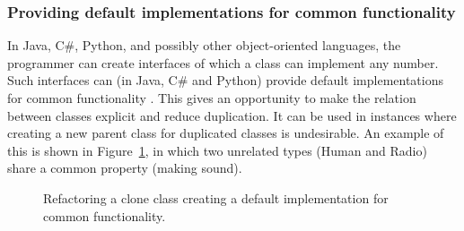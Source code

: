 \subsubsection{Providing default implementations for common functionality}
In Java, C\#, Python, and possibly other object-oriented languages, the programmer can create interfaces of which a class can implement any number. Such interfaces can (in Java, C\# and Python) provide default implementations for common functionality \cite{mohnen2002interfaces}. This gives an opportunity to make the relation between classes explicit and reduce duplication. It can be used in instances where creating a new parent class for duplicated classes is undesirable. An example of this is shown in Figure~\ref{fig:createinterfaceabstraction}, in which two unrelated types (Human and Radio) share a common property (making sound).

\begin{figure}[H]
\begin{parcolumns}{2}
\end{parcolumns}
\caption{Refactoring a clone class creating a default implementation for common functionality.}
\label{fig:createinterfaceabstraction}
\end{figure}


